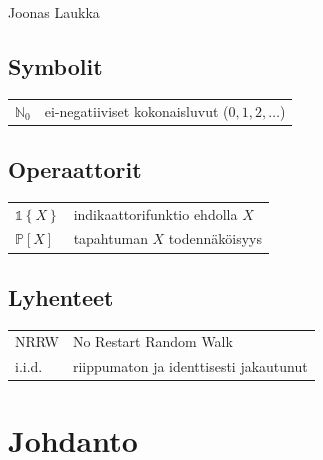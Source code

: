 \documentclass[finnish, 12pt, a4paper, sci, utf8, pdfa]{aaltothesis}
\newcommand{\N}{\mathbb{N}}
\newcommand{\indicator}{\mathopen{\mathds{1}}}
\newcommand*{\prob}{\mathbb{P}}
\begin{document}
\vspace{5mm}
{\hfill Joonas Laukka \hspace{1cm}}

\newpage


\thesistableofcontents



\subsection*{Symbolit}

\begin{tabular}{ll}
$\N_{0}$  & ei-negatiiviset kokonaisluvut (\( 0, 1, 2, \ldots \))  \\
\end{tabular}

\subsection*{Operaattorit}

\begin{tabular}{ll}
   $ \indicator \left\{ X \right\} $               & indikaattorifunktio ehdolla $ X $\\
   $ \prob \left[ X \right] $                      & tapahtuman $ X $ todennäköisyys\\
\end{tabular}

\subsection*{Lyhenteet}

\begin{tabular}{ll}
NRRW       & No Restart Random Walk\\
i.i.d.     & riippumaton ja identtisesti jakautunut\\
\end{tabular}


\cleardoublepage

\section{Johdanto}

\thispagestyle{empty}
\end{document}
